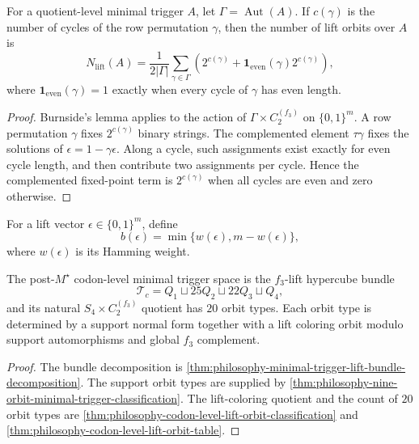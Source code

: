 \begin{theorem}
\label{thm:philosophy-burnside-lift-orbit-formula}
For a quotient-level minimal trigger $A$, let $\Gamma=\operatorname{Aut}(A)$.
If $c(\gamma)$ is the number of cycles of the row permutation $\gamma$,
then the number of lift orbits over $A$ is
$$
  N_{\mathrm{lift}}(A)
  =
  \frac{1}{2|\Gamma|}
  \sum_{\gamma\in\Gamma}
  \left(
    2^{c(\gamma)}
    +
    \mathbf{1}_{\mathrm{even}}(\gamma)2^{c(\gamma)}
  \right),
$$
where $\mathbf{1}_{\mathrm{even}}(\gamma)=1$ exactly when every cycle of
$\gamma$ has even length.
\end{theorem}
\begin{proof}
Burnside's lemma applies to the action of
$\Gamma\times C_{2}^{(f_{3})}$ on $\{0,1\}^{m}$. A row permutation
$\gamma$ fixes $2^{c(\gamma)}$ binary strings. The complemented element
$\tau\gamma$ fixes the solutions of $\epsilon=1-\gamma\epsilon$.
Along a cycle, such assignments exist exactly for even cycle length,
and then contribute two assignments per cycle. Hence the complemented
fixed-point term is $2^{c(\gamma)}$ when all cycles are even and zero
otherwise.
\end{proof}

\begin{definition}
\label{def:philosophy-lift-imbalance}
For a lift vector $\epsilon\in\{0,1\}^{m}$, define
$$
  b(\epsilon)
  =
  \min\{w(\epsilon),m-w(\epsilon)\},
$$
where $w(\epsilon)$ is its Hamming weight.
\end{definition}

\begin{theorem}
\label{thm:philosophy-codon-level-minimal-trigger-orbit-theorem}
The post-$M^{\star}$ codon-level minimal trigger space is the
$f_{3}$-lift hypercube bundle
$$
  \mathcal{T}_{c}
  =
  Q_{1}
  \sqcup
  25Q_{2}
  \sqcup
  22Q_{3}
  \sqcup
  Q_{4},
$$
and its natural $S_{4}\times C_{2}^{(f_{3})}$ quotient has $20$ orbit
types. Each orbit type is determined by a support normal form together
with a lift coloring orbit modulo support automorphisms and global
$f_{3}$ complement.
\end{theorem}
\begin{proof}
The bundle decomposition is
\autoref{thm:philosophy-minimal-trigger-lift-bundle-decomposition}. The
support orbit types are supplied by
\autoref{thm:philosophy-nine-orbit-minimal-trigger-classification}. The
lift-coloring quotient and the count of $20$ orbit types are
\autoref{thm:philosophy-codon-level-lift-orbit-classification} and
\autoref{thm:philosophy-codon-level-lift-orbit-table}.
\end{proof}

